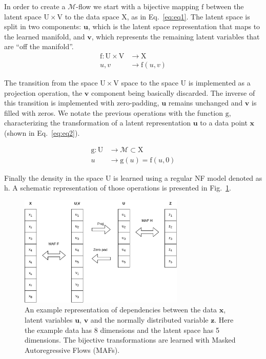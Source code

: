 \documentclass[letterpaper,11pt]{article}
\begin{document}
In order to create a $\mathcal{M}$-flow we start with a bijective mapping $\mathrm{f}$ between the latent space $\mathrm{U} \times \mathrm{V}$ to the data space $\mathrm{X}$, as in Eq.~\ref{eq:eq1}. The latent space is split in two components: $\mathbf{u}$, which is the latent space representation that maps to the learned manifold, and $\mathbf{v}$, which represents the remaining latent variables that are “off the manifold”. 
\begin{equation}
    \begin{split}
        \mathrm{f}: \mathrm{U} \times \mathrm{V} & \rightarrow \mathrm{X} \\ u,v &\rightarrow \mathrm{f}(u,v)
    \end{split}
    \label{eq:eq1}
\end{equation}

The transition from the space $\mathrm{U} \times \mathrm{V}$ space to the space $\mathrm{U}$ is implemented as a projection operation, the $\mathbf{v}$ component being basically discarded. The inverse of this transition is implemented with zero-padding, $\mathbf{u}$ remains unchanged and $\mathbf{v}$ is filled with zeros. We notate the previous operations with the function $\mathrm{g}$, characterizing the transformation of a latent representation $\mathbf{u}$ to a data point $\mathbf{x}$ (shown in Eq.~\ref{eq:eq2}). 

\begin{equation}
    \begin{split}
        \mathrm{g}: \mathrm{U} & \rightarrow \mathcal{M} \subset \mathrm{X} \\ 
        u &\rightarrow \mathrm{g}(u) = \mathrm{f}(u,0) 
    \end{split}
    \label{eq:eq2}
\end{equation}

Finally the density in the space $\mathrm{U}$ is learned using a regular NF model denoted as $\mathrm{h}$. A schematic representation of those operations is presented in Fig.~\ref{fig:fig1}.

\begin{figure}[h!]
    \centering
    \includegraphics[width=0.7\textwidth]{img/mflow.png}
    \caption{An  example representation of dependencies between the data $\mathbf{x}$, latent variables $\mathbf{u}$, $\mathbf{v}$ and the normally distributed variable $\mathbf{z}$. Here the example data has 8 dimensions and the latent space has 5 dimensions. The bijective transformations are learned with Masked Autoregressive Flows (MAFs).}
    \label{fig:fig1}
\end{figure}
\end{document}
